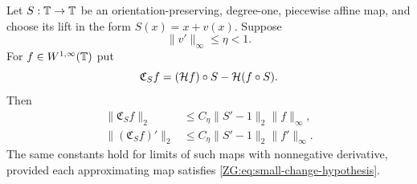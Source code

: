 \begin{lemma}
\label{ZG:lem:small-change}
Let $S:\mathbb T\to\mathbb T$ be an orientation-preserving, degree-one, piecewise
affine map, and choose its lift in the form $S(x)=x+v(x)$.  Suppose
\begin{equation}\label{ZG:eq:small-change-hypothesis}
 \|v'\|_\infty\le\eta<1.
\end{equation}
For $f\in W^{1,\infty}(\mathbb T)$ put
\[
 \mathfrak C_Sf=(\mathcal H f)\circ S-\mathcal H(f\circ S).
\]
Then
\begin{align}
 \|\mathfrak C_Sf\|_2
 &\le C_\eta\|S'-1\|_2\|f\|_\infty,
 \label{ZG:eq:small-change-H0}\\
 \|(\mathfrak C_Sf)'\|_2
 &\le C_\eta\|S'-1\|_2\|f'\|_\infty.
 \label{ZG:eq:small-change-H1}
\end{align}
The same constants hold for limits of such maps with nonnegative
derivative, provided each approximating map satisfies
\eqref{ZG:eq:small-change-hypothesis}.
\end{lemma}

